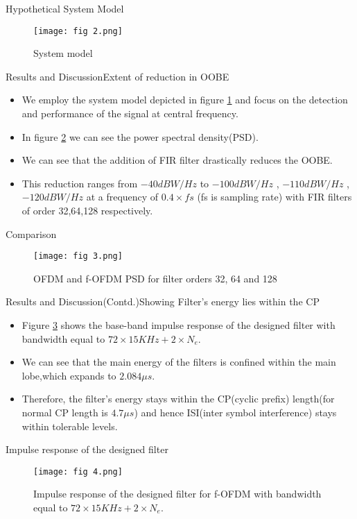 \documentclass{beamer}
\begin{document}
\begin{frame}{Hypothetical System Model}
  \begin{figure}[H]
    \centering
    \texttt{[image: fig 2.png]}
    \caption{System model}
    \label{fig: 2}
\end{figure}
\end{frame}
\begin{frame}{Results and Discussion}{Extent of reduction in OOBE}
    \begin{itemize}
        \item We employ the system model depicted in figure \ref{fig: 2} and focus on the detection and performance of the signal at central frequency.
        \item  In figure \ref{fig: 3} we can see the power spectral density(PSD).
        \item We can see that the addition of FIR filter drastically reduces the OOBE.
        \item This reduction ranges from $-40 dBW/Hz$ to $-100 dBW/Hz$ , $-110 dBW/Hz$ ,$-120 dBW/Hz$ at a frequency of $0.4 \times fs$ (fs is sampling rate) with FIR filters of order 32,64,128 respectively.
        \end{itemize}
\end{frame}
\begin{frame}{Comparison}
\begin{figure}[H]
    \centering
    \texttt{[image: fig 3.png]}
    \caption{OFDM and f-OFDM PSD for filter orders 32, 64 and 128}
    \label{fig: 3}
\end{figure}
\end{frame}
\begin{frame}{Results and Discussion(Contd.)}{Showing Filter's energy lies within the CP}
\begin{itemize}
    \item Figure \ref{fig: 4} shows the base-band impulse response of the designed filter with bandwidth equal to $72 \times 15 KHz + 2 \times N_e$.
    \item We can see that the main energy of the filters is confined within the main lobe,which expands to $2.084\mu s$.
    \item Therefore, the filter's energy stays within the CP(cyclic prefix) length(for normal CP length is $4.7 \mu s$) and hence ISI(inter symbol interference) stays within tolerable levels.
\end{itemize}
\end{frame}
\begin{frame}{Impulse response of the designed filter}
\begin{figure}
    \centering
    \texttt{[image: fig 4.png]}
    \caption{Impulse response of the designed filter for f-OFDM with bandwidth
equal to $72 \times 15 KHz + 2 \times N_e$.}
    \label{fig: 4}
\end{figure}
\end{frame}
\end{document}
